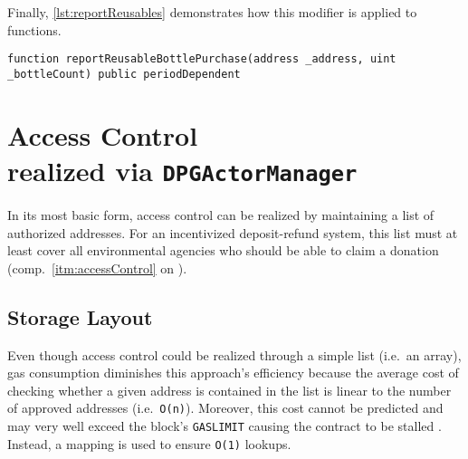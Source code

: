 \FloatBarrier

Finally, \autoref{lst:reportReusables} demonstrates how this modifier is applied to functions.

\begin{lstlisting}[language=Solidity, caption=Function signature to report reusable bottle purchase, label=lst:reportReusables]
function reportReusableBottlePurchase(address _address, uint _bottleCount) public periodDependent
\end{lstlisting}



\pagebreak

\section[Access Control]{Access Control\\ {\normalsize realized via \texttt{DPGActorManager}}}
In its most basic form, access control can be realized by maintaining a list of authorized addresses. For an incentivized deposit-refund system, this list must at least cover all environmental agencies who should be able to claim a donation (comp.~\ref{itm:accessControl} on ). 

\subsection{Storage Layout}
Even though access control could be realized through a simple list (i.e.~an array), gas consumption diminishes this approach's efficiency because the average cost of checking whether a given address is contained in the list is linear to the number of approved addresses (i.e.~\texttt{O(n)}). Moreover, this cost cannot be predicted and may very well exceed the block's \texttt{GASLIMIT} causing the contract to be stalled \cite[p.~122]{solidityDocs}. Instead, a mapping is used to ensure \texttt{O(1)} lookups.


